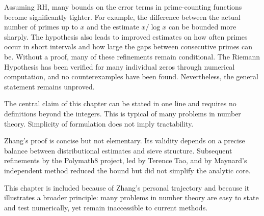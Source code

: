Assuming RH, many bounds on the error terms in prime-counting functions become significantly tighter. For example, the difference between the actual number of primes up to $x$ and the estimate $x / \log x$ can be bounded more sharply. The hypothesis also leads to improved estimates on how often primes occur in short intervals and how large the gaps between consecutive primes can be. Without a proof, many of these refinements remain conditional. The Riemann Hypothesis has been verified for many individual zeros through numerical computation, and no counterexamples have been found. Nevertheless, the general statement remains unproved.


\begin{commentary}
The central claim of this chapter can be stated in one line and requires no definitions beyond the integers. This is typical of many problems in number theory. Simplicity of formulation does not imply tractability.

Zhang’s proof is concise but not elementary. Its validity depends on a precise balance between distributional estimates and sieve structure. Subsequent refinements by the Polymath8 project, led by Terence Tao, and by Maynard’s independent method reduced the bound but did not simplify the analytic core.

This chapter is included because of Zhang’s personal trajectory and because it illustrates a broader principle: many problems in number theory are easy to state and test numerically, yet remain inaccessible to current methods.
\end{commentary}

\clearpage
{}


